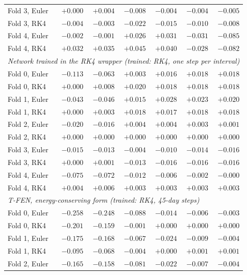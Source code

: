 \begin{table}[!h]
\begin{tabular}{l r r r r r r}
    Fold 3, Euler & $+0.000$ & $+0.004$ & $-0.008$ & $-0.004$ & $-0.004$ & $-0.005$ \\
    Fold 3, RK4 & $-0.004$ & $-0.003$ & $-0.022$ & $-0.015$ & $-0.010$ & $-0.008$ \\
    Fold 4, Euler & $-0.002$ & $-0.001$ & $+0.026$ & $+0.031$ & $-0.031$ & $-0.085$ \\
    Fold 4, RK4 & $+0.032$ & $+0.035$ & $+0.045$ & $+0.040$ & $-0.028$ & $-0.082$ \\
    \midrule
    \multicolumn{7}{l}{\emph{Network trained in the RK4 wrapper (trained: RK4, one step per interval)}} \\
    Fold 0, Euler & $-0.113$ & $-0.063$ & $+0.003$ & $+0.016$ & $+0.018$ & $+0.018$ \\
    Fold 0, RK4 & $+0.000$ & $+0.008$ & $+0.020$ & $+0.018$ & $+0.018$ & $+0.018$ \\
    Fold 1, Euler & $-0.043$ & $-0.046$ & $+0.015$ & $+0.028$ & $+0.023$ & $+0.020$ \\
    Fold 1, RK4 & $+0.000$ & $+0.003$ & $+0.018$ & $+0.017$ & $+0.018$ & $+0.018$ \\
    Fold 2, Euler & $-0.020$ & $-0.016$ & $+0.004$ & $+0.004$ & $+0.003$ & $+0.001$ \\
    Fold 2, RK4 & $+0.000$ & $+0.000$ & $+0.000$ & $+0.000$ & $+0.000$ & $+0.000$ \\
    Fold 3, Euler & $-0.015$ & $-0.013$ & $-0.004$ & $-0.010$ & $-0.014$ & $-0.016$ \\
    Fold 3, RK4 & $+0.000$ & $+0.001$ & $-0.013$ & $-0.016$ & $-0.016$ & $-0.016$ \\
    Fold 4, Euler & $-0.075$ & $-0.072$ & $-0.012$ & $-0.006$ & $-0.002$ & $-0.000$ \\
    Fold 4, RK4 & $+0.004$ & $+0.006$ & $+0.003$ & $+0.003$ & $+0.003$ & $+0.003$ \\
    \midrule
    \multicolumn{7}{l}{\emph{T-FEN, energy-conserving form (trained: RK4, 45-day steps)}} \\
    Fold 0, Euler & $-0.258$ & $-0.248$ & $-0.088$ & $-0.014$ & $-0.006$ & $-0.003$ \\
    Fold 0, RK4 & $-0.201$ & $-0.159$ & $-0.001$ & $+0.000$ & $+0.000$ & $+0.000$ \\
    Fold 1, Euler & $-0.175$ & $-0.168$ & $-0.067$ & $-0.024$ & $-0.009$ & $-0.004$ \\
    Fold 1, RK4 & $-0.095$ & $-0.068$ & $-0.004$ & $+0.000$ & $+0.001$ & $+0.001$ \\
    Fold 2, Euler & $-0.165$ & $-0.158$ & $-0.081$ & $-0.022$ & $-0.007$ & $-0.004$ \\

\end{tabular}
\end{table}
